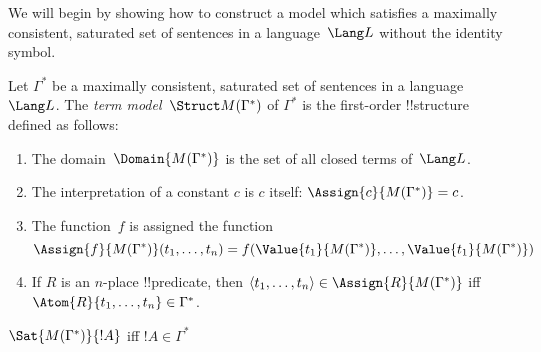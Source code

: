 \documentclass[../../include/open-logic-section]{subfiles}
\begin{document}

We will begin by showing how to construct a model which satisfies a maximally consistent, saturated set of sentences in a language~$\Lang L$ without the identity symbol.

\begin{defn}
Let $\Gamma^*$ be a maximally consistent, saturated set of sentences
in a language~$\Lang L$.  The \emph{term model}~$\Struct M(\Gamma^*)$
of $\Gamma^*$ is the first-order !!{structure} defined as follows:
\begin{enumerate}
\item The domain~$\Domain{M(\Gamma^*)}$ is the set of all closed terms
  of~$\Lang L$.
\item The interpretation of a constant $c$ is $c$ itself:
  $\Assign{c}{M(\Gamma^*)} = c$.
\item The function~$f$ is assigned the function
\[
\Assign{f}{M(\Gamma^*)}(t_1, \dots, t_n) = f(\Value{t_1}{M(\Gamma^*)},
\dots, \Value{t_1}{M(\Gamma^*)})
\]
\item If $R$ is an $n$-place !!{predicate}, then $\langle t_1, \dots,
  t_n\rangle \in \Assign{R}{M(\Gamma^*)}$ iff $\Atom{R}{t_1, \dots,
    t_n} \in \Gamma^*$.
\end{enumerate}
\end{defn}

\begin{lem}
$\Sat{M(\Gamma^*)}{!A}$ iff $!A \in \Gamma^*$
\end{lem}
\end{document}

